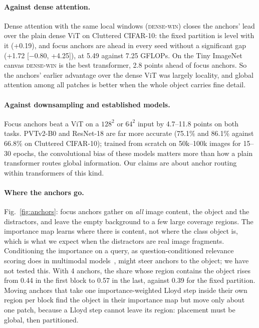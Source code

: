 \documentclass[10pt]{article}
\newcommand{\densewin}{\textsc{dense-win}}
\begin{document}
\paragraph{Against dense attention.} Dense attention with the same local windows (\densewin)
closes the anchors' lead over the plain dense ViT on Cluttered CIFAR-10: the fixed partition is
level with it (+0.19), and focus anchors are ahead in every seed without a significant gap
(+1.72 [$-$0.80, +4.25]), at 5.49 against 7.25 GFLOPs. On the Tiny ImageNet canvas \densewin{} is
the best transformer, 2.8 points ahead of focus anchors. So the anchors' earlier advantage over
the dense ViT was largely locality, and global attention among all patches is better when the
whole object carries fine detail.

\paragraph{Against downsampling and established models.} Focus anchors beat a ViT on a
$128^2$ or $64^2$ input by 4.7--11.8 points on both tasks. PVTv2-B0 and ResNet-18 are far more
accurate (75.1\% and 86.1\% against 66.8\% on Cluttered CIFAR-10); trained from scratch on
50k--100k images for 15--30 epochs, the convolutional bias of these models matters more than how
a plain transformer routes global information. Our claims are about anchor routing within
transformers of this kind.

\paragraph{Where the anchors go.} Fig.~\ref{fig:anchors}: focus anchors gather on \emph{all}
image content, the object and the distractors, and leave the empty background to a few large
coverage regions. The importance map learns where there is content, not where the class object
is, which is what we expect when the distractors are real image fragments. Conditioning the
importance on a query, as question-conditioned relevance scoring does in multimodal
models~\citep{jiang2026lens}, might steer anchors to the object; we have not tested this. With 4 anchors, the
share whose region contains the object rises from 0.44 in the first block to 0.57 in the last,
against 0.39 for the fixed partition. Moving anchors that take one importance-weighted Lloyd step
inside their own region per block find the object in their importance map but move only about one
patch, because a Lloyd step cannot leave its region: placement must be global, then partitioned.
\end{document}
